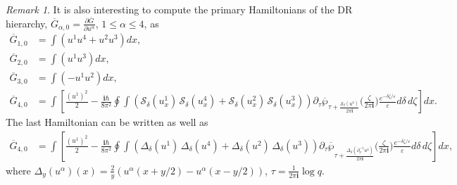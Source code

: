 \documentclass{amsart}
\numberwithin{equation}{section} %
\theoremstyle{plain}
\theoremstyle{remark}
\newtheorem{remark}[theorem]{Remark}
\def\cxi{\mathbf{i}}
\begin{document}
\begin{remark}
It is also interesting to compute the primary Hamiltonians of the DR hierarchy, $\overline{G}_{\alpha,0} = \frac{\partial \overline{G}}{\partial u^\alpha}$, $1 \leq \alpha\leq 4$, as
\begin{align*}
\overline{G}_{1,0} & = \int \left(u^1 u^4 + u^2 u^3\right) dx, \\
\overline{G}_{2,0} & = \int \left( u^1 u^3\right) dx,\\
\overline{G}_{3,0} & = \int \left(-u^1 u^2 \right) dx,\\
\overline{G}_{4,0} & = \int \left[ \frac{(u^1)^2}{2} - \frac{\cxi \hbar}{8\pi^2}%
\oint\!\!\int \left(\mathcal{S}_{\delta} ( u^1_x) \,\mathcal{S}_{\delta}( u^4_x) + \mathcal{S}_{\delta}( u^2_x)\,\mathcal{S}_{\delta}( u^3_x)\right)
	\partial_\tau \overline{\wp}_{\tau+\frac{\mathcal{S}_{\delta} (u^4)}{2\pi\cxi}}\Big(\frac{\zeta}{2\pi\cxi}\Big) \frac{e^{-\delta\zeta / \varepsilon}}{\varepsilon}
	d\delta\, d\zeta \right] dx.
\end{align*}
The last Hamiltonian can be written as well as
\begin{align*}
\overline{G}_{4,0} &= \int \left[ \frac{(u^1)^2}{2} - \frac{\cxi \hbar}{8\pi^2} 
\oint\!\!\int
\left(\Delta_{\delta} ( u^1) \,\Delta_{\delta}( u^4) + \Delta_{\delta}( u^2)\,\Delta_{\delta}( u^3)\right)
	\partial_\tau \overline{\wp}_{\tau+\frac{\Delta_{\delta} (\partial_x^{-1}u^4)}{2\pi\cxi}}\Big(\frac{\zeta}{2\pi\cxi}\Big) \frac{e^{-\delta\zeta / \varepsilon}}{\varepsilon}
	d\delta\, d\zeta \right] dx,
\end{align*}
where $\Delta_y (u^\alpha)(x)= \frac{2}{y}\left(u^\alpha(x+y/2) - u^\alpha(x-y/2)\right)$, $\tau=\frac{1}{2\pi \cxi} \log q$.\\
\end{remark}
\end{document}
